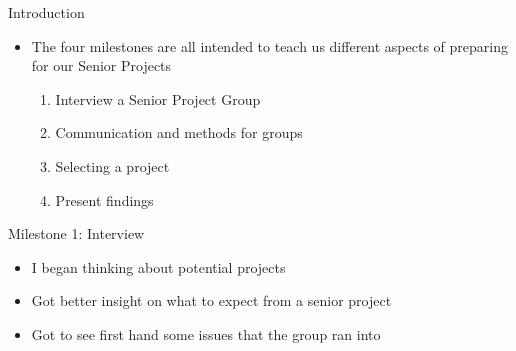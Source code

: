 \documentclass[10pt]{beamer}
\begin{document}







\begin{frame}[fragile]{Introduction}
  \begin{itemize}
    \item The four milestones are all intended to teach us different aspects of preparing for our Senior Projects
    \begin{enumerate}
      \item Interview a Senior Project Group
      \item Communication and methods for groups
      \item Selecting a project
      \item Present findings
    \end{enumerate}
  \end{itemize}
\end{frame}

\begin{frame}[fragile]{Milestone 1: Interview}
  \begin{itemize}
    \item I began thinking about potential projects
    \item Got better insight on what to expect from a senior project
    \item Got to see first hand some issues that the group ran into
  \end{itemize}
\end{frame}
\end{document}
